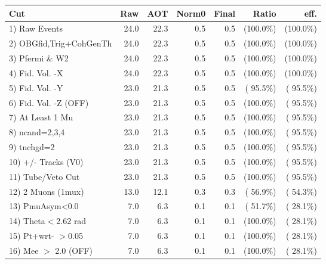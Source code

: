  \begin{table}[h!]\centering
 \begin{tabular}{||l||r|r|r|r|r|r||}
 \hline
 \hline
 Cut & Raw & AOT & Norm0 & Final & Ratio & eff.       \\
 \hline
  1) Raw Events           &         24.0 &         22.3 &          0.5 &          0.5 & (100.0\%) & (100.0\%) \\
  2) OBGfid,Trig+CohGenTh &         24.0 &         22.3 &          0.5 &          0.5 & (100.0\%) & (100.0\%) \\
  3) Pfermi \& W2         &         24.0 &         22.3 &          0.5 &          0.5 & (100.0\%) & (100.0\%) \\
  4) Fid. Vol. -X         &         24.0 &         22.3 &          0.5 &          0.5 & (100.0\%) & (100.0\%) \\
  5) Fid. Vol. -Y         &         23.0 &         21.3 &          0.5 &          0.5 & ( 95.5\%) & ( 95.5\%) \\
  6) Fid. Vol. -Z (OFF)   &         23.0 &         21.3 &          0.5 &          0.5 & (100.0\%) & ( 95.5\%) \\
  7) At Least 1 Mu        &         23.0 &         21.3 &          0.5 &          0.5 & (100.0\%) & ( 95.5\%) \\
  8) ncand=2,3,4          &         23.0 &         21.3 &          0.5 &          0.5 & (100.0\%) & ( 95.5\%) \\
  9) tnchgd=2             &         23.0 &         21.3 &          0.5 &          0.5 & (100.0\%) & ( 95.5\%) \\
 10) +/- Tracks (V0)      &         23.0 &         21.3 &          0.5 &          0.5 & (100.0\%) & ( 95.5\%) \\
 11) Tube/Veto Cut        &         23.0 &         21.3 &          0.5 &          0.5 & (100.0\%) & ( 95.5\%) \\
 12) 2 Muons (1mux)       &         13.0 &         12.1 &          0.3 &          0.3 & ( 56.9\%) & ( 54.3\%) \\
 13) PmuAsym<0.0          &          7.0 &          6.3 &          0.1 &          0.1 & ( 51.7\%) & ( 28.1\%) \\
 14) Theta$<$2.62 rad     &          7.0 &          6.3 &          0.1 &          0.1 & (100.0\%) & ( 28.1\%) \\
 15) Pt+wrt- $>$0.05      &          7.0 &          6.3 &          0.1 &          0.1 & (100.0\%) & ( 28.1\%) \\
 16) Mee $>$ 2.0  (OFF)   &          7.0 &          6.3 &          0.1 &          0.1 & (100.0\%) & ( 28.1\%) \\

\end{tabular}
\end{table}
